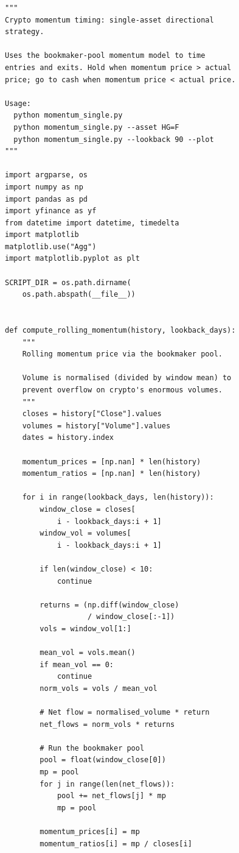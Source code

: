 \documentclass[11pt,a4paper]{article}
\begin{document}
\begin{codebox}
\begin{lstlisting}[style=python]
"""
Crypto momentum timing: single-asset directional
strategy.

Uses the bookmaker-pool momentum model to time
entries and exits. Hold when momentum price > actual
price; go to cash when momentum price < actual price.

Usage:
  python momentum_single.py
  python momentum_single.py --asset HG=F
  python momentum_single.py --lookback 90 --plot
"""

import argparse, os
import numpy as np
import pandas as pd
import yfinance as yf
from datetime import datetime, timedelta
import matplotlib
matplotlib.use("Agg")
import matplotlib.pyplot as plt

SCRIPT_DIR = os.path.dirname(
    os.path.abspath(__file__))


def compute_rolling_momentum(history, lookback_days):
    """
    Rolling momentum price via the bookmaker pool.

    Volume is normalised (divided by window mean) to
    prevent overflow on crypto's enormous volumes.
    """
    closes = history["Close"].values
    volumes = history["Volume"].values
    dates = history.index

    momentum_prices = [np.nan] * len(history)
    momentum_ratios = [np.nan] * len(history)

    for i in range(lookback_days, len(history)):
        window_close = closes[
            i - lookback_days:i + 1]
        window_vol = volumes[
            i - lookback_days:i + 1]

        if len(window_close) < 10:
            continue

        returns = (np.diff(window_close)
                   / window_close[:-1])
        vols = window_vol[1:]

        mean_vol = vols.mean()
        if mean_vol == 0:
            continue
        norm_vols = vols / mean_vol

        # Net flow = normalised_volume * return
        net_flows = norm_vols * returns

        # Run the bookmaker pool
        pool = float(window_close[0])
        mp = pool
        for j in range(len(net_flows)):
            pool += net_flows[j] * mp
            mp = pool

        momentum_prices[i] = mp
        momentum_ratios[i] = mp / closes[i]


\end{lstlisting}
\end{codebox}
\end{document}
